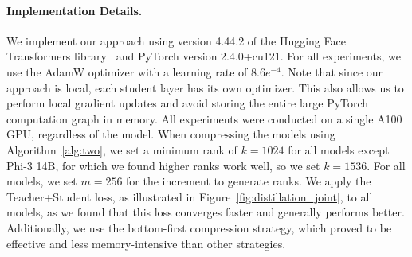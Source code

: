 \paragraph{Implementation Details.}
We implement our approach using version 4.44.2 of the Hugging Face Transformers library~\citep{wolf2020huggingfaces} and PyTorch version 2.4.0+cu121. For all experiments, we use the AdamW optimizer with a learning rate of $8.6e^{-4}$. Note that since our approach is local, each student layer has its own optimizer. This also allows us to perform local gradient updates and avoid storing the entire large PyTorch computation graph in memory. All experiments were conducted on a single A100 GPU, regardless of the model.
When compressing the models using Algorithm~\ref{alg:two}, we set a minimum rank of $k=1024$ for all models except Phi-3 14B, for which we found higher ranks work well, so we set $k=1536$. For all models, we set $m=256$ for the increment to generate ranks.
We apply the Teacher+Student loss, as illustrated in Figure~\ref{fig:distillation_joint}, to all models, as we found that this loss converges faster and generally performs better. Additionally, we use the bottom-first compression strategy, which proved to be effective and less memory-intensive than other strategies.

